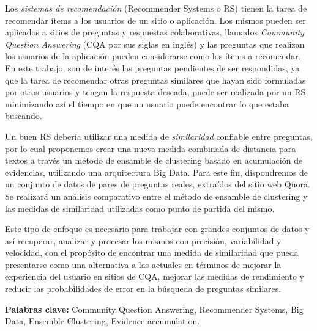 \abstract

\noindent Los \textit{sistemas de recomendación} (Recommender Systems o RS) tienen la tarea de recomendar ítems a los usuarios de un sitio o aplicación. Los mismos pueden ser aplicados a sitios de preguntas y respuestas colaborativas, llamados \textit{Community Question Answering} (CQA por sus siglas en inglés) y las preguntas que realizan los usuarios de la aplicación pueden considerarse como los ítems a recomendar. En este trabajo, son de interés las preguntas pendientes de ser respondidas, ya que la tarea de recomendar otras preguntas similares que hayan sido formuladas por otros usuarios y tengan la respuesta deseada, puede ser realizada por un RS, minimizando así el tiempo en que un usuario puede encontrar lo que estaba buscando.

\bigskip Un buen RS debería utilizar una medida de \textit{similaridad} confiable entre preguntas, por lo cual proponemos crear una nueva medida combinada de distancia para textos a través un método de ensamble de clustering basado en acumulación de evidencias, utilizando una arquitectura Big Data. Para este fin, dispondremos de un conjunto de datos de pares de preguntas reales, extraídos del sitio web Quora. Se realizará un análisis comparativo entre el método de ensamble de clustering y las medidas de similaridad utilizadas como punto de partida del mismo.

\bigskip Este tipo de enfoque es necesario para trabajar con grandes conjuntos de datos y así recuperar, analizar y procesar los mismos con precisión, variabilidad y velocidad, con el propósito de encontrar una medida de similaridad que pueda presentarse como una alternativa a las actuales en términos de mejorar la experiencia del usuario en sitios de CQA, mejorar las medidas de rendimiento y reducir las probabilidades de error en la búsqueda de preguntas similares.

\bigskip

\noindent\textbf{Palabras clave:}  Community Question Answering, Recommender Systems, Big Data, Ensemble Clustering, Evidence accumulation.